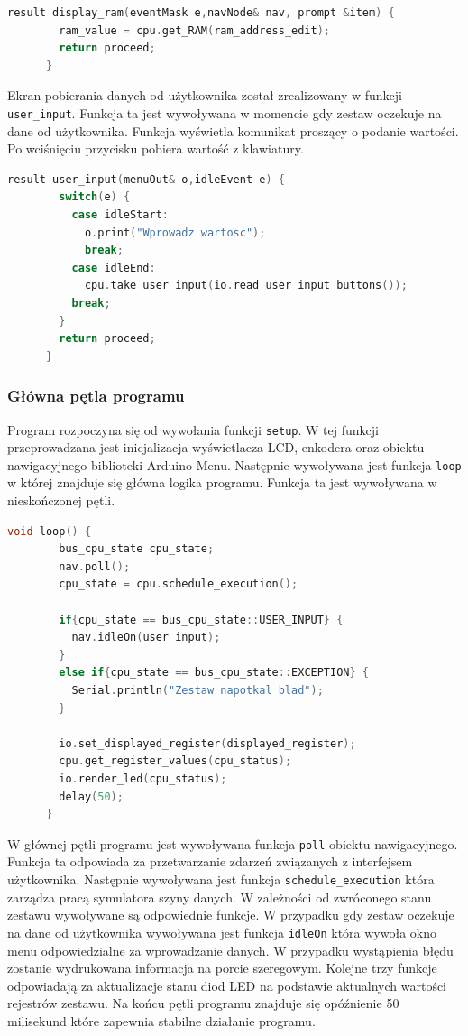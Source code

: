 \documentclass[../main.tex]{subfiles}
\begin{document}
\begin{lstlisting}[language=C++]
      result display_ram(eventMask e,navNode& nav, prompt &item) {
        ram_value = cpu.get_RAM(ram_address_edit);
        return proceed;
      }
\end{lstlisting}

\par
Ekran pobierania danych od użytkownika został zrealizowany w funkcji \texttt{user\_input}. Funkcja ta jest wywoływana w momencie gdy zestaw
oczekuje na dane od użytkownika. Funkcja wyświetla komunikat proszący o podanie wartości. Po wciśnięciu przycisku pobiera wartość z klawiatury.

\begin{lstlisting}[language=C++]
    result user_input(menuOut& o,idleEvent e) {
        switch(e) {
          case idleStart:
            o.print("Wprowadz wartosc");
            break;
          case idleEnd:
            cpu.take_user_input(io.read_user_input_buttons());
          break;
        }
        return proceed;
      }
\end{lstlisting}

\subsubsection{Główna pętla programu}

Program rozpoczyna się od wywołania funkcji \texttt{setup}. W tej funkcji przeprowadzana jest inicjalizacja wyświetlacza LCD, enkodera
oraz obiektu nawigacyjnego biblioteki Arduino Menu. Następnie wywoływana jest funkcja \texttt{loop} w której znajduje się główna logika programu.
Funkcja ta jest wywoływana w nieskończonej pętli.

\begin{lstlisting}[language=C++]
    void loop() {
        bus_cpu_state cpu_state;
        nav.poll();
        cpu_state = cpu.schedule_execution();
      
        if{cpu_state == bus_cpu_state::USER_INPUT} {
          nav.idleOn(user_input);
        }
        else if{cpu_state == bus_cpu_state::EXCEPTION} {
          Serial.println("Zestaw napotkal blad"); 
        }
      
        io.set_displayed_register(displayed_register);
        cpu.get_register_values(cpu_status);
        io.render_led(cpu_status);
        delay(50);
      }
\end{lstlisting}

W głównej pętli programu jest wywoływana funkcja \texttt{poll} obiektu nawigacyjnego. Funkcja ta odpowiada za przetwarzanie zdarzeń
związanych z interfejsem użytkownika. Następnie wywoływana jest funkcja \texttt{schedule\_execution} która zarządza pracą symulatora
szyny danych. W zależności od zwróconego stanu zestawu wywoływane są odpowiednie funkcje. W przypadku gdy zestaw oczekuje na dane od użytkownika
wywoływana jest funkcja \texttt{idleOn} która wywoła okno menu odpowiedzialne za wprowadzanie danych. W przypadku wystąpienia błędu zostanie
wydrukowana informacja na porcie szeregowym. Kolejne trzy funkcje odpowiadają za aktualizacje stanu diod LED na podstawie aktualnych wartości
rejestrów zestawu. Na końcu pętli programu znajduje się opóźnienie 50 milisekund które zapewnia stabilne działanie programu.
\end{document}
